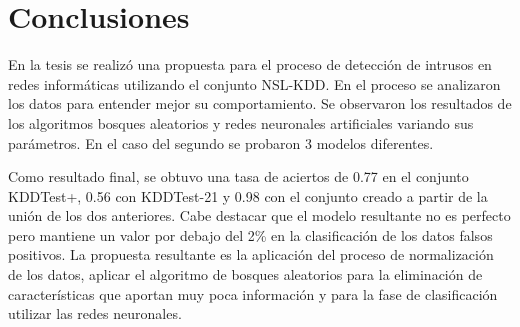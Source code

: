 \chapter*{Conclusiones}\label{chapter:conclusions}

En la tesis se realizó una propuesta para el proceso de detección de intrusos en redes informáticas utilizando el conjunto NSL-KDD. En el proceso se analizaron los datos para entender mejor su comportamiento. Se observaron los resultados de los algoritmos bosques aleatorios y redes neuronales artificiales variando sus parámetros. En el caso del segundo se probaron 3 modelos diferentes. 

Como resultado final, se obtuvo una tasa de aciertos de 0.77 en el conjunto KDDTest+, 0.56 con KDDTest-21 y 0.98 con el conjunto creado a partir de la unión de los dos anteriores. Cabe destacar que el modelo resultante no es perfecto pero mantiene un valor por debajo del 2\% en la clasificación de los datos falsos positivos. La propuesta resultante es la aplicación del proceso de normalización de los datos, aplicar el algoritmo de bosques aleatorios para la eliminación de características que aportan muy poca información y para la fase de clasificación utilizar las redes neuronales.

